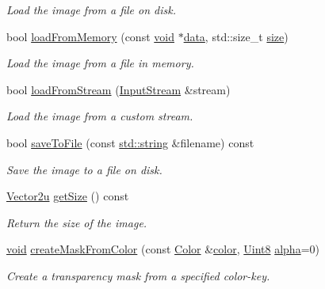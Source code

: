 \begin{DoxyCompactItemize}
\begin{DoxyCompactList}\small\item\em Load the image from a file on disk. \end{DoxyCompactList}\item 
bool \hyperlink{classsf_1_1_image_aaa6c7afa5851a51cec6ab438faa7354c}{load\-From\-Memory} (const \hyperlink{glutf90_8h_ac778d6f63f1aaf8ebda0ce6ac821b56e}{void} $\ast$\hyperlink{gl3_8h_a0f78eecb0891cce3bdfc815b971866a1}{data}, std\-::size\-\_\-t \hyperlink{gl3_8h_a79ef9eb3e59c4bb34c4b9fbeb8d28ff7}{size})
\begin{DoxyCompactList}\small\item\em Load the image from a file in memory. \end{DoxyCompactList}\item 
bool \hyperlink{classsf_1_1_image_a21122ded0e8368bb06ed3b9acfbfb501}{load\-From\-Stream} (\hyperlink{classsf_1_1_input_stream}{Input\-Stream} \&stream)
\begin{DoxyCompactList}\small\item\em Load the image from a custom stream. \end{DoxyCompactList}\item 
bool \hyperlink{classsf_1_1_image_aec0ed16b67df7b512aaa5c53388ba14e}{save\-To\-File} (const \hyperlink{gl3_8h_ac83513893df92266f79a515488701770}{std\-::string} \&filename) const 
\begin{DoxyCompactList}\small\item\em Save the image to a file on disk. \end{DoxyCompactList}\item 
\hyperlink{namespacesf_aaa02ba42bf79b001a376fe9d79254cb3}{Vector2u} \hyperlink{classsf_1_1_image_a5c3e9bebdc001c3ebf85ca97039fc86b}{get\-Size} () const 
\begin{DoxyCompactList}\small\item\em Return the size of the image. \end{DoxyCompactList}\item 
\hyperlink{glutf90_8h_ac778d6f63f1aaf8ebda0ce6ac821b56e}{void} \hyperlink{classsf_1_1_image_a22f13f8c242a6b38eb73cc176b37ae34}{create\-Mask\-From\-Color} (const \hyperlink{classsf_1_1_color}{Color} \&\hyperlink{gl3_8h_a3ea846f998d64f079b86052b6c4193a8}{color}, \hyperlink{namespacesf_a4ef3d630785c4f296f9b4f274c33d78e}{Uint8} \hyperlink{gl3_8h_a090ebe65994a3ee4bb60ae3472abffc5}{alpha}=0)
\begin{DoxyCompactList}\small\item\em Create a transparency mask from a specified color-\/key. \end{DoxyCompactList}\item 

\end{DoxyCompactItemize}
